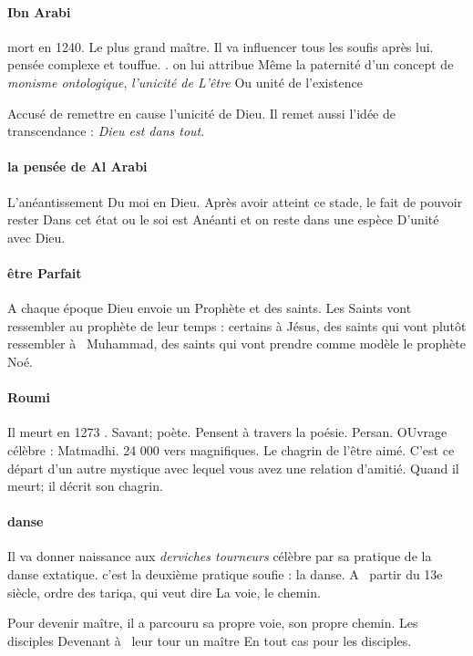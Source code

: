 \paragraph{Ibn Arabi}
 mort 
en 1240. 
Le plus grand maître. 
Il va influencer 
tous les soufis après lui. 
  pensée 
complexe et touffue. 
 . on lui attribue 
Même la paternité d'un concept de \textit{monisme ontologique}, \textit{l'unicité de 
L'être 
} Ou unité de l'existence 
 
 
Accusé de remettre en cause 
 l'unicité de Dieu. Il remet aussi l'idée de transcendance : \textit{Dieu est dans tout}. 

\paragraph{la pensée de Al Arabi} 

 
L'anéantissement 
Du moi en Dieu. 
Après avoir atteint ce stade,  le fait de pouvoir rester Dans cet état ou le soi est 
Anéanti et on reste dans une espèce 
D'unité avec Dieu.

\paragraph{être 
Parfait } A chaque époque Dieu envoie un Prophète et des saints. Les Saints vont ressembler au prophète de leur temps : certains à Jésus, des saints qui  vont plutôt ressembler à  Muhammad, des saints qui  vont prendre comme modèle le prophète 
Noé.



\paragraph{Roumi } Il meurt en 1273 . Savant; poète. Pensent 
à travers la poésie. Persan. OUvrage célèbre : Matmadhi. 24 000 vers magnifiques. Le chagrin de l'être aimé. 
C'est ce départ d'un autre mystique 
avec lequel vous avez une relation d'amitié. Quand il meurt; il décrit son 
chagrin. 
\paragraph{danse}
Il va donner naissance aux  \textit{derviches tourneurs} célèbre par sa pratique de la danse extatique. 
  c'est la deuxième  pratique soufie : la danse.
 A  partir du 13e siècle, ordre des  tariqa, qui  veut dire 
La voie, le chemin.

Pour devenir maître, il a parcouru sa propre voie, son propre chemin.
Les disciples 
Devenant à  leur tour un maître 
En tout cas pour les disciples.  

